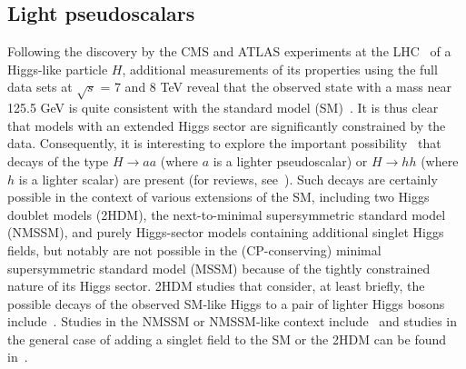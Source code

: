 \subsection{Light pseudoscalars\label{sec:lighta}}
Following the discovery by the CMS and ATLAS experiments at the LHC~\cite{Aad:2012tfa,Chatrchyan:2012ufa} of a Higgs-like particle $H$, additional measurements of its properties using the full data sets at $\sqrt{s}$ = 7 and 8 TeV reveal that the observed state with a mass near 125.5 GeV is quite consistent with the standard model (SM)~\cite{ATLASnew,CMS:new,Aad:2013wqa}. It is thus clear that models with an extended Higgs sector are significantly constrained by the data.  Consequently, it is interesting to explore the important possibility~\cite{Dermisek:2005ar,Dermisek:2006wr} that decays of the type $H$$\rightarrow$$aa$ (where $a$ is a lighter pseudoscalar) or $H$$\rightarrow$$hh$ (where $h$ is a lighter scalar) are present (for reviews, see~\cite{Chang:2008cw,Curtin:2013fra}). Such decays are certainly possible in the context of various extensions of the SM, including two Higgs doublet models (2HDM), the next-to-minimal supersymmetric standard model (NMSSM), and purely Higgs-sector models containing additional singlet Higgs fields, but notably are not possible in the (CP-conserving) minimal supersymmetric standard model (MSSM) because of the tightly constrained nature of its Higgs sector. 2HDM studies that consider, at least briefly, the possible decays of the observed SM-like Higgs to a pair of lighter Higgs bosons include~\cite{Celis:2013rcs,Grinstein:2013npa,Coleppa:2013dya,Chen:2013rba,Craig:2013hca,Wang:2013sha,Curtin:2013fra,Baglio:2014nea}. Studies in the NMSSM or NMSSM-like context include~\cite{King:2012tr,Cao:2013gba,Christensen:2013dra,Cerdeno:2013cz,Curtin:2013fra} and studies in the general case of adding a singlet field to the SM or the 2HDM can be found in~\cite{Chalons:2012qe,Ahriche:2013vqa,Curtin:2013fra}.


